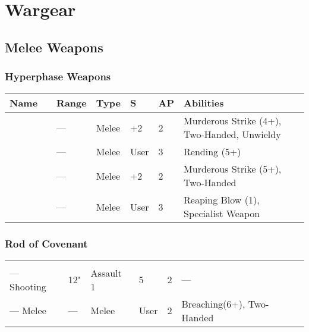\section{Wargear}

\subsection{Melee Weapons} \label{Melee Weapons}

\subsubsection{Hyperphase Weapons} 

\label{Hyperphase Sword} \label{Hyperphase Thresher} \label{Hyperphase Reap-Blade} \label{Hyperphase Harvester}
\noindent
\begin{tabular}{||m{110pt} m{30pt} m{31pt} m{55pt} m{12pt} m{12pt} m{210pt}||}
	\hline
	Name & & Range & Type & S & AP & Abilities \\
	\hline
	\quickref{Hyperphase Harvester} &  & — & Melee & +2 & 2 & Murderous Strike (4+), Two-Handed, Unwieldy \\
	\quickref{Hyperphase Sword} &  & — & Melee & User & 3 & Rending (5+) \\
	\quickref{Hyperphase Reap-Blade} &  & — & Melee & +2 & 2 & Murderous Strike (5+), Two-Handed \\
	\quickref{Hyperphase Thresher} &  & — & Melee & User & 3 & Reaping Blow (1), Specialist Weapon \\
	\hline
\end{tabular}

\subsubsection{Rod of Covenant} \label{Rod of Covenant}

\noindent
\begin{tabular}{||m{110pt} m{31pt} m{55pt} m{12pt} m{12pt} m{210pt}||}
	\quickref{Rod of Covenant} &  &  &  &  & \\
	— Shooting & 12" & Assault 1 & 5 & 2 & — \\
	— Melee & — & Melee & User & 2 & Breaching(6+), Two-Handed \\
\end{tabular}

